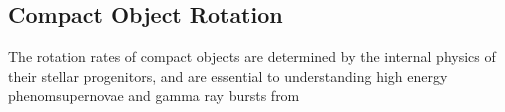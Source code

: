 {\color{orange}

\subsection{Compact Object Rotation}

The rotation rates of compact objects are determined by the internal physics of their stellar progenitors, and are essential to understanding high energy phenomsupernovae and gamma ray bursts from 

}